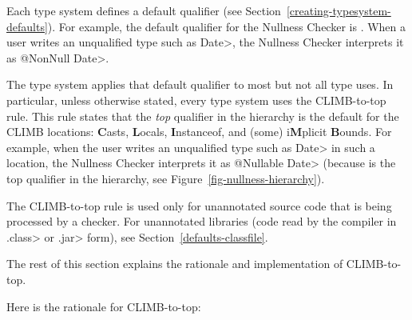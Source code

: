 
Each type system defines a default qualifier (see
Section~\ref{creating-typesystem-defaults}).  For example, the default
qualifier for the Nullness Checker is
.  When a user
writes an unqualified type such as \<Date>, the Nullness Checker interprets it as
\<@NonNull Date>.

The type system applies that default qualifier to most but
not all type uses.  In particular, unless otherwise stated, every type system
uses the CLIMB-to-top rule.  This
rule states that the \emph{top} qualifier in the hierarchy is the default for
the CLIMB locations:  \textbf{C}asts, \textbf{L}ocals, \textbf{I}nstanceof,
and (some) i\textbf{M}plicit \textbf{B}ounds.
For example, when the user writes an unqualified type such as \<Date> in such a
location, the Nullness Checker interprets it as \<@Nullable Date> (because
 is the top qualifier in the
hierarchy, see Figure~\ref{fig-nullness-hierarchy}).


The CLIMB-to-top rule is used only for unannotated source code that is
being processed by a checker.  For unannotated libraries (code read by the
compiler in \<.class> or \<.jar> form), see Section~\ref{defaults-classfile}.

The rest of this section explains the rationale and implementation of
CLIMB-to-top.

Here is the rationale for CLIMB-to-top:

